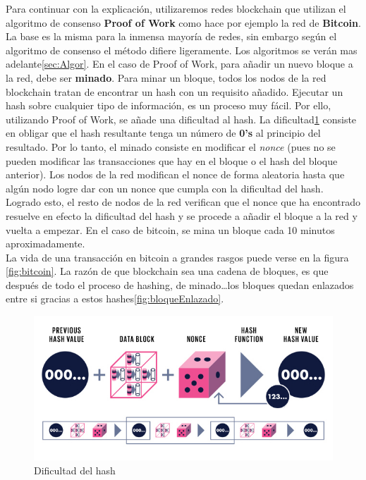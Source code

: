 Para continuar con la explicación, utilizaremos redes blockchain que utilizan el algoritmo de consenso \textbf{Proof of Work}\cite{whatIsProofOfWork} como hace por ejemplo la red de \textbf{Bitcoin}\cite{whatIsBitcoin}. La base es la misma para la inmensa mayoría de redes, sin embargo según el algoritmo de consenso el método difiere ligeramente. Los algoritmos se verán mas adelante\ref{sec:Algor}. En el caso de Proof of Work, para añadir un nuevo bloque a la red, debe ser \textbf{minado}\cite{minarBitcoin}. Para minar un bloque, todos los nodos de la red blockchain tratan de encontrar un hash con un requisito añadido. Ejecutar un hash sobre cualquier tipo de información, es un proceso muy fácil. Por ello, utilizando Proof of Work, se añade una dificultad al hash. La dificultad\ref{fig:hashDiff} consiste en obligar que el hash resultante tenga un número de \textbf{0's} al principio del resultado. Por lo tanto, el minado consiste en modificar el \emph{nonce} (pues no se pueden modificar las transacciones que hay en el bloque o el hash del bloque anterior). Los nodos de la red modifican el nonce de forma aleatoria hasta que algún nodo logre dar con un nonce que cumpla con la dificultad del hash. Logrado esto, el resto de nodos de la red verifican que el nonce que ha encontrado resuelve en efecto la dificultad del hash y se procede a añadir el bloque a la red y vuelta a empezar. En el caso de bitcoin, se mina un bloque cada 10 minutos aproximadamente. \\

La vida de una transacción en bitcoin a grandes rasgos puede verse en la figura \ref{fig:bitcoin}. La razón de que blockchain sea una cadena de bloques, es que después de todo el proceso de hashing, de minado\dots los bloques quedan enlazados entre si gracias a estos hashes\ref{fig:bloqueEnlazado}. 

\begin{figure}[h!]
  \centering
  \includegraphics[width=0.8\linewidth]{figs/EstadoArte/Blockchain/hashDificultad}
  \caption[Hash dificultad]{Dificultad del hash}
  \label{fig:hashDiff}
\end{figure}

